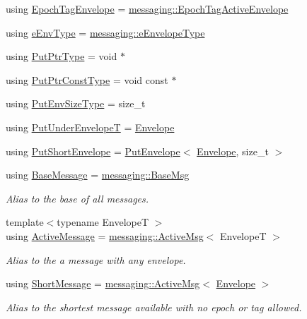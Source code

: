 \begin{DoxyCompactItemize}
using \hyperlink{namespacevt_af23b58014ced6898422213a0e5e6a27a}{Epoch\+Tag\+Envelope} = \hyperlink{structvt_1_1messaging_1_1_epoch_tag_active_envelope}{messaging\+::\+Epoch\+Tag\+Active\+Envelope}
\item 
using \hyperlink{namespacevt_abdfe9ac50e3799705ee21853c1509bf6}{e\+Env\+Type} = \hyperlink{namespacevt_1_1messaging_a6508ef3a4701a2e6fd0bfe3edcc63a6c}{messaging\+::e\+Envelope\+Type}
\item 
using \hyperlink{namespacevt_a537693bfe0223c71eb52bdbd6ea2c741}{Put\+Ptr\+Type} = void $\ast$
\item 
using \hyperlink{namespacevt_a494d6c6dc5cdb9a8d61eaedfa2c4d4f3}{Put\+Ptr\+Const\+Type} = void const  $\ast$
\item 
using \hyperlink{namespacevt_aa241444e21c15238e185923792814fe4}{Put\+Env\+Size\+Type} = size\+\_\+t
\item 
using \hyperlink{namespacevt_a233c004b26ccd826ef10686169371e01}{Put\+Under\+EnvelopeT} = \hyperlink{namespacevt_aa9c8cc094b5361482021d63012987814}{Envelope}
\item 
using \hyperlink{namespacevt_a8d7a7de9e76bfea1600009a775b7298c}{Put\+Short\+Envelope} = \hyperlink{structvt_1_1_put_envelope}{Put\+Envelope}$<$ \hyperlink{namespacevt_aa9c8cc094b5361482021d63012987814}{Envelope}, size\+\_\+t $>$
\item 
using \hyperlink{namespacevt_ac34f95a5e2b8109b55bfba52b074443d}{Base\+Message} = \hyperlink{structvt_1_1messaging_1_1_base_msg}{messaging\+::\+Base\+Msg}
\begin{DoxyCompactList}\small\item\em Alias to the base of all messages. \end{DoxyCompactList}\item 
{\footnotesize template$<$typename EnvelopeT $>$ }\\using \hyperlink{namespacevt_a00eb67bd138395b6a4f744fab3fa0678}{Active\+Message} = \hyperlink{structvt_1_1messaging_1_1_active_msg}{messaging\+::\+Active\+Msg}$<$ EnvelopeT $>$
\begin{DoxyCompactList}\small\item\em Alias to the a message with any envelope. \end{DoxyCompactList}\item 
using \hyperlink{namespacevt_a1125ac1da6c0bbf141e0ea0739d7602d}{Short\+Message} = \hyperlink{structvt_1_1messaging_1_1_active_msg}{messaging\+::\+Active\+Msg}$<$ \hyperlink{namespacevt_aa9c8cc094b5361482021d63012987814}{Envelope} $>$
\begin{DoxyCompactList}\small\item\em Alias to the shortest message available with no epoch or tag allowed. \end{DoxyCompactList}\item 

\end{DoxyCompactItemize}
